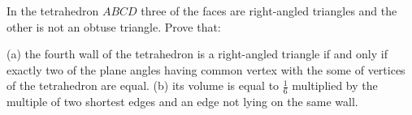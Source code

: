 In the tetrahedron $ABCD$ three of the faces are right-angled triangles and the other is not an obtuse triangle. Prove that:

(a) the fourth wall of the tetrahedron is a right-angled triangle if and only if exactly two of the plane angles having common vertex with the some of vertices of the tetrahedron are equal.
(b) its volume is equal to $\frac16$ multiplied by the multiple of two shortest edges and an edge not lying on the same wall.